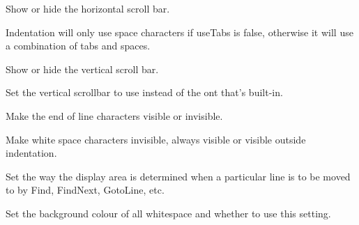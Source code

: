 
Show or hide the horizontal scroll bar.


\label{wxstyledtextctrlsetusetabs}


Indentation will only use space characters if useTabs is false, otherwise
it will use a combination of tabs and spaces.


\label{wxstyledtextctrlsetuseverticalscrollbar}


Show or hide the vertical scroll bar.


\label{wxstyledtextctrlsetvscrollbar}


Set the vertical scrollbar to use instead of the ont that's built-in.


\label{wxstyledtextctrlsetvieweol}


Make the end of line characters visible or invisible.


\label{wxstyledtextctrlsetviewwhitespace}


Make white space characters invisible, always visible or visible outside indentation.


\label{wxstyledtextctrlsetvisiblepolicy}


Set the way the display area is determined when a particular line
is to be moved to by Find, FindNext, GotoLine, etc.


\label{wxstyledtextctrlsetwhitespacebackground}


Set the background colour of all whitespace and whether to use this setting.


